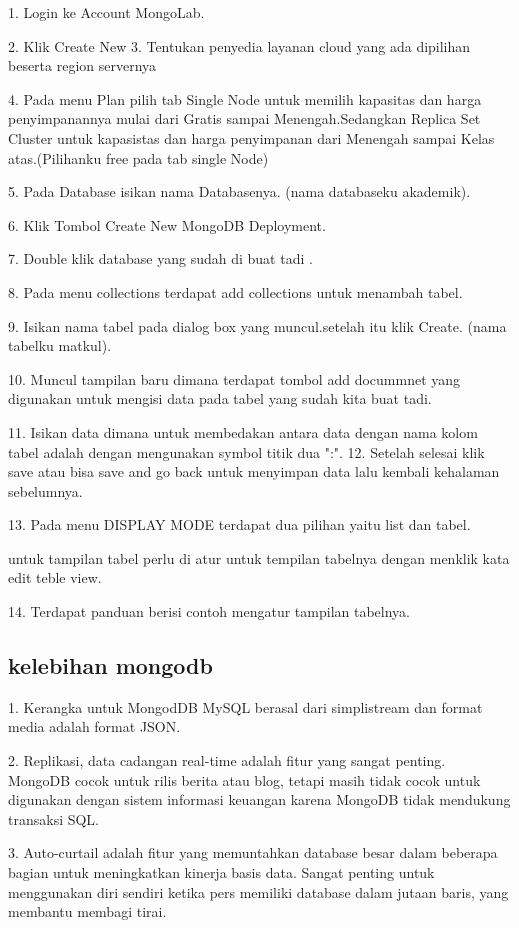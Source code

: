 1. Login ke Account MongoLab.

2. Klik Create New
3. Tentukan penyedia layanan cloud yang ada dipilihan beserta region servernya

4. Pada menu Plan pilih tab Single Node untuk memilih kapasitas dan harga penyimpanannya mulai dari Gratis sampai Menengah.Sedangkan Replica Set Cluster untuk kapasistas dan harga penyimpanan dari Menengah sampai Kelas atas.(Pilihanku free pada tab single Node)

5. Pada Database isikan nama Databasenya. (nama databaseku akademik).

6. Klik Tombol Create New MongoDB Deployment.

7. Double klik database yang sudah di buat tadi .

8. Pada menu collections terdapat add collections untuk menambah tabel.

9. Isikan nama tabel pada dialog box yang muncul.setelah itu klik Create. (nama tabelku matkul).

10. Muncul tampilan baru dimana terdapat tombol add docummnet yang digunakan untuk mengisi data pada tabel yang sudah kita buat tadi.

11. Isikan data dimana untuk membedakan antara data dengan nama kolom tabel adalah dengan mengunakan symbol titik dua ":".
12. Setelah selesai klik save atau bisa save and go back untuk menyimpan data lalu kembali kehalaman sebelumnya.

13. Pada menu DISPLAY MODE terdapat dua pilihan yaitu list dan tabel. 

untuk tampilan tabel perlu di atur untuk tempilan tabelnya dengan menklik kata edit teble view.

14. Terdapat panduan berisi contoh mengatur tampilan tabelnya.

\subsection {kelebihan mongodb}

1. Kerangka untuk MongodDB MySQL berasal dari simplistream dan format media adalah format JSON.

2. Replikasi, data cadangan real-time adalah fitur yang sangat penting. MongoDB cocok untuk rilis berita atau blog, tetapi masih tidak cocok untuk digunakan dengan sistem informasi keuangan karena MongoDB tidak mendukung transaksi SQL.

3. Auto-curtail adalah fitur yang memuntahkan database besar dalam beberapa bagian untuk meningkatkan kinerja basis data. Sangat penting untuk menggunakan diri sendiri ketika pers memiliki database dalam jutaan baris, yang membantu membagi tirai.

